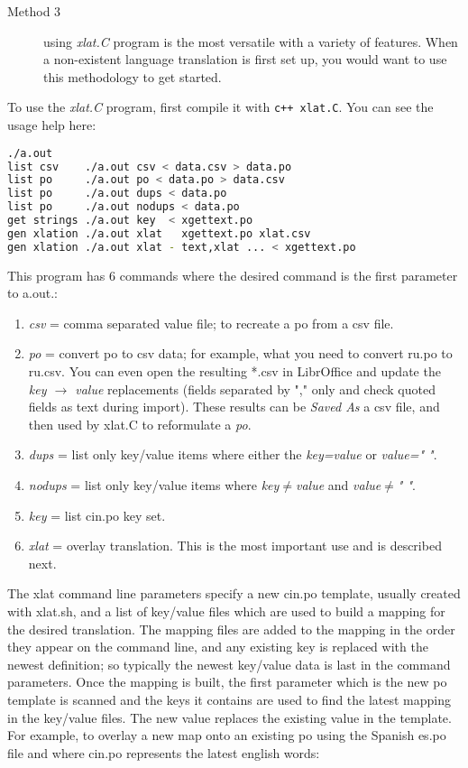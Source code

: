 \begin{description}
	\item[Method 3 ] using \textit{xlat.C} program is the most versatile with a variety of features.  When a non-existent language translation is first set up, you would want to use this methodology to get started.
\end{description}

To use the \textit{xlat.C} program, first compile it with \texttt{c++ xlat.C}.  You can see the usage help here:

\begin{lstlisting}[language=bash,numbers=none]
	./a.out 
list csv    ./a.out csv < data.csv > data.po
list po     ./a.out po < data.po > data.csv
list po     ./a.out dups < data.po
list po     ./a.out nodups < data.po
get strings ./a.out key  < xgettext.po
gen xlation ./a.out xlat   xgettext.po xlat.csv
gen xlation ./a.out xlat - text,xlat ... < xgettext.po
\end{lstlisting}

This program has 6 commands where the desired command is the first parameter to a.out.:

\begin{enumerate}
	\item \textit{csv} = comma separated value file; to recreate a po from a csv file.
	\item \textit{po}  = convert po to csv data;  for example, what you need to convert ru.po to ru.csv.
	You can even open the resulting *.csv in LibrOffice and update the \textit{key $\rightarrow$ value} replacements
	(fields separated by "," only and check quoted fields as text during import).  These results can
	be \textit{Saved As} a csv file, and then used by xlat.C to reformulate a \textit{po}.
	\item \textit{dups} = list only key/value items where either the \textit{key=value} or \textit{value=" "}.
	\item \textit{nodups} = list only key/value items where \textit{key$\ne$value} and \textit{value$\ne$" "}.
	\item \textit{key} = list cin.po key set.
	\item \textit{xlat} = overlay translation.  This is the most important use and is described next.
\end{enumerate}

The xlat command line parameters specify a new cin.po template, usually created with xlat.sh, and a list of key/value files which are used to build a mapping for the desired translation.  The mapping files are added to the mapping in the order they appear on the command line, and any existing key is replaced with the newest definition; so typically the newest key/value data is last in the command parameters.  
Once the mapping is built, the first parameter which is the new po template is scanned and the keys it contains are used to find the latest mapping in the key/value files.  The new value replaces the existing value in the template.  For example, to overlay a new map onto an existing po using the Spanish es.po file and where cin.po represents the latest english words:

